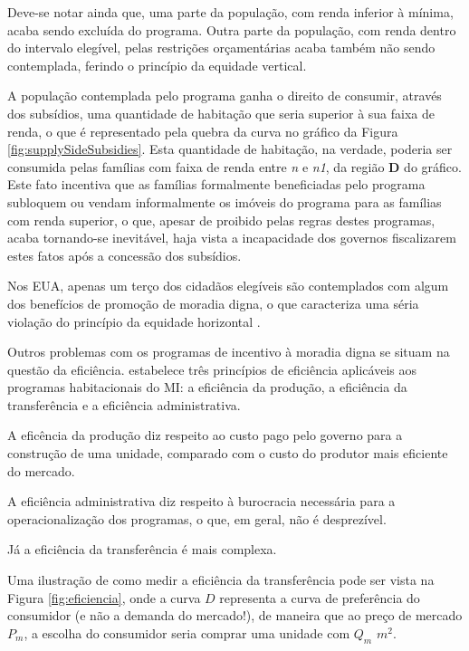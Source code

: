 \documentclass[
	12pt,				%
	oneside,			%
	a4paper,			%
	chapter=TITLE,		%
	section=TITLE,		%
	english,			%
	brazil				%
	]{abntex2}
\begin{document}
\begin{refsection}
Deve-se notar ainda que, uma parte da população, com renda inferior à mínima,
acaba sendo excluída do programa. Outra parte da população, com renda dentro do
intervalo elegível, pelas restrições orçamentárias acaba também não sendo
contemplada, ferindo o princípio da equidade vertical.

A população contemplada pelo programa ganha o direito de consumir, através dos
subsídios, uma quantidade de habitação que seria superior à sua faixa de renda,
o que é representado pela quebra da curva no gráfico da Figura
\ref{fig:supplySideSubsidies}. Esta quantidade de habitação, na verdade,
poderia ser consumida pelas famílias com faixa de renda entre \emph{n} e \emph{n1}, da
região \textbf{D} do gráfico. Este fato incentiva que as famílias formalmente
beneficiadas pelo programa subloquem ou vendam informalmente os imóveis do
programa para as famílias com renda superior, o que, apesar de proibido pelas
regras destes programas, acaba tornando-se inevitável, haja vista a incapacidade
dos governos fiscalizarem estes fatos após a concessão dos subsídios.

Nos \gls{EUA}, apenas um terço dos cidadãos elegíveis são contemplados com algum
dos benefícios de promoção de moradia digna, o que caracteriza uma séria
violação do princípio da equidade horizontal \autocites{malpezzi_affordable_2018_2}{malpezzi_affordable_2018_3}.

Outros problemas com os programas de incentivo à moradia digna se situam na
questão da eficiência. \textcite{malpezzi_affordable_2018_1} estabelece três princípios de
eficiência aplicáveis aos programas habitacionais do \gls{MI}: a eficiência da
produção, a eficiência da transferência e a eficiência administrativa.

A eficência da produção diz respeito ao custo pago pelo governo para a construção
de uma unidade, comparado com o custo do produtor mais eficiente do mercado.

A eficiência administrativa diz respeito à burocracia necessária para a
operacionalização dos programas, o que, em geral, não é desprezível.

Já a eficiência da transferência é mais complexa.

Uma ilustração de como medir a eficiência da transferência pode ser vista na
Figura \ref{fig:eficiencia}, onde a curva \(D\) representa a curva de preferência
do consumidor (e não a demanda do mercado!), de maneira que ao preço de mercado
\(P_m\), a escolha do consumidor seria comprar uma unidade com \(Q_m\) \(m^2\).


\end{refsection}
\end{document}
